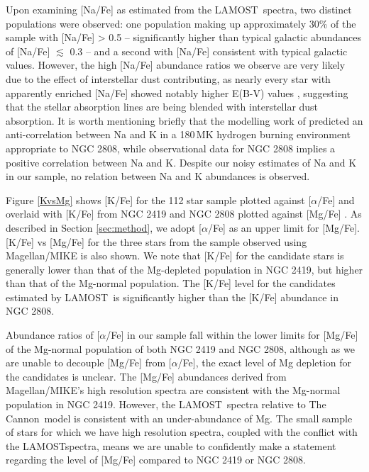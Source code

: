 \documentclass[a4paper,fleqn,usenatbib]{mnras}
\newcommand{\project}[1]{#1}
\newcommand{\lamost}{\project{LAMOST}}
\newcommand{\tc}{\project{The Cannon}}
\begin{document}
Upon examining [Na/Fe] as estimated from the \lamost\ spectra, two distinct populations were observed: one population making up approximately 30\% of the sample with [Na/Fe] > 0.5 -- significantly higher than typical galactic abundances of [Na/Fe] $\lesssim$ 0.3 \citep{kobayashi2011} -- and a second with [Na/Fe] consistent with typical galactic values. However, the high [Na/Fe] abundance ratios we observe are very likely due to the effect of interstellar dust contributing, as nearly every star with apparently enriched [Na/Fe] showed notably higher E(B-V) values \citep{schlafly2011}, suggesting that the stellar absorption lines are being blended with interstellar dust absorption. It is worth mentioning briefly that the modelling work of \cite{prantzos2017} predicted an anti-correlation between Na and K in a 180\,MK hydrogen burning environment appropriate to NGC 2808, while observational data for NGC 2808 implies a positive correlation between Na and K. Despite our noisy estimates of Na and K in our sample, no relation between Na and K abundances is observed.

Figure \ref{KvsMg} shows [K/Fe]  for the 112 star sample plotted against $[\alpha$/Fe] and overlaid with [K/Fe] from NGC 2419 and NGC 2808 plotted against [Mg/Fe] \citep{cohenkirby2012, mucciarelli2012, mucciarelli2015}. As described in Section \ref{sec:method}, we adopt [$\alpha$/Fe] as an upper limit for [Mg/Fe]. [K/Fe] vs [Mg/Fe] for the three stars from the sample observed using Magellan/MIKE is also shown. 
We note that [K/Fe] for the candidate stars is generally lower than that of the Mg-depleted population in NGC 2419, but higher than that of the Mg-normal population. The [K/Fe] level for the candidates estimated by \lamost\ is significantly higher than the [K/Fe] abundance in NGC 2808. 

Abundance ratios of [$\alpha$/Fe] in our sample fall within the lower limits for [Mg/Fe] of the Mg-normal population of both NGC 2419 and NGC 2808, although as we are unable to decouple [Mg/Fe] from $[\alpha$/Fe], the exact level of Mg depletion for the candidates is unclear. The [Mg/Fe] abundances derived from Magellan/MIKE's high resolution spectra are consistent with the Mg-normal population in NGC 2419. However, the \lamost\ spectra relative to \tc\ model is consistent with an under-abundance of Mg. The small sample of stars for which we have high resolution spectra, coupled with the conflict with the \lamost spectra, means we are unable to confidently make a statement regarding the level of [Mg/Fe] compared to NGC 2419 or NGC 2808.
\end{document}
